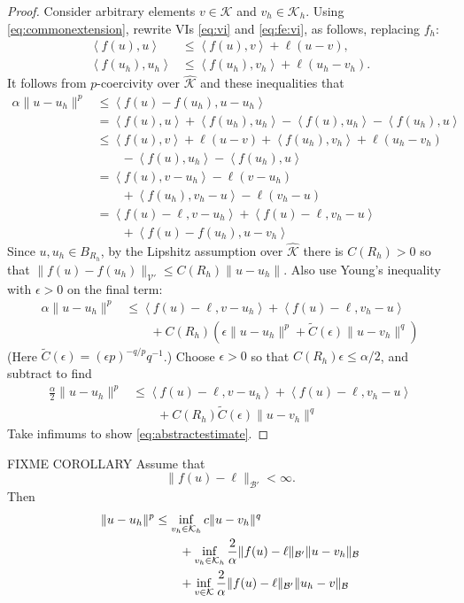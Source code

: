 \documentclass[hidelinks,onefignum,onetabnum,final]{siamart220329}  %
\newcommand{\eps}{\epsilon}
\newcommand{\cB}{\mathcal{B}}
\newcommand{\cK}{\mathcal{K}}
\newcommand{\cV}{\mathcal{V}}
\newcommand{\hcK}{\widehat{\cK}}
\newcommand{\ip}[2]{\left<#1,#2\right>}
\begin{document}
\begin{proof}  Consider arbitrary elements $v\in\cK$ and $v_h\in\cK_h$.  Using \eqref{eq:commonextension}, rewrite VIs \eqref{eq:vi} and \eqref{eq:fe:vi}, as follows, replacing $f_h$:
\begin{align*}
\ip{f(u)}{u}     &\le \ip{f(u)}{v} + \ell(u-v),  \\
\ip{f(u_h)}{u_h} &\le \ip{f(u_h)}{v_h} + \ell(u_h-v_h).
\end{align*}
It follows from $p$-coercivity over $\hcK$ and these inequalities that
\begin{align*}
\alpha \|u-u_h\|^p &\le \ip{f(u)-f(u_h)}{u-u_h} \\
  &= \ip{f(u)}{u} + \ip{f(u_h)}{u_h} - \ip{f(u)}{u_h} - \ip{f(u_h)}{u} \\
  &\le \ip{f(u)}{v} + \ell(u-v) + \ip{f(u_h)}{v_h} + \ell(u_h-v_h) \\
  &\qquad - \ip{f(u)}{u_h} - \ip{f(u_h)}{u} \\
  &= \ip{f(u)}{v-u_h} - \ell(v-u_h) \\
  &\qquad + \ip{f(u_h)}{v_h-u} - \ell(v_h-u) \\
  &= \ip{f(u)-\ell}{v-u_h} + \ip{f(u)-\ell}{v_h-u} \\
  &\qquad + \ip{f(u)-f(u_h)}{u-v_h}
\end{align*}
Since $u,u_h\in B_{R_h}$, by the Lipshitz assumption over $\hcK$ there is $C(R_h)>0$ so that $\|f(u)-f(u_h)\|_{\cV'} \le C(R_h) \|u-u_h\|$.  Also use Young's inequality with $\eps>0$ \cite[Appendix B.2]{Evans2010} on the final term:
\begin{align*}
\alpha \|u-u_h\|^p &\le \ip{f(u)-\ell}{v-u_h} + \ip{f(u)-\ell}{v_h-u} \\
  &\qquad + C(R_h) \left(\eps\|u-u_h\|^p + \tilde C(\eps) \|u-v_h\|^q\right)
\end{align*}
(Here $\tilde C(\eps) = (\eps p)^{-q/p} q^{-1}$.)  Choose $\eps>0$ so that $C(R_h) \eps \le \alpha/2$, and subtract to find
\begin{align*}
\frac{\alpha}{2} \|u-u_h\|^p &\le \ip{f(u)-\ell}{v-u_h} + \ip{f(u)-\ell}{v_h-u} \\
  &\qquad + C(R_h) \tilde C(\eps) \|u-v_h\|^q
\end{align*}
Take infimums to show \eqref{eq:abstractestimate}.
\end{proof}

FIXME COROLLARY Assume that
\begin{equation}
\|f(u)-\ell\|_{\cB'} < \infty.  \label{eq:fellboundedB}
\end{equation}
Then
\begin{align}
\|u-u_h\|^p &\le \inf_{v_h\in\cK_h} c \|u - v_h\|^q  \label{eq:NORMabstractestimate} \\
   &\qquad + \inf_{v_h\in\cK_h} \frac{2}{\alpha} \|f(u)-\ell\|_{\cB'} \|u-v_h\|_{\cB} \notag \\
   &\qquad + \inf_{v\in\cK} \frac{2}{\alpha} \|f(u)-\ell\|_{\cB'} \|u_h-v\|_{\cB} \notag
\end{align}
\end{document}
